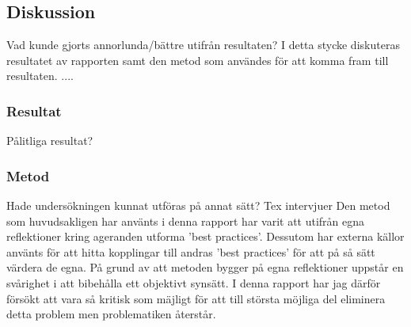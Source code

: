 \subsection{Diskussion}
Vad kunde gjorts annorlunda/bättre utifrån resultaten?
\newline \newline
I detta stycke diskuteras resultatet av rapporten samt den metod som användes för att komma fram till resultaten. ....

\subsubsection{Resultat}
Pålitliga resultat? 

\subsubsection{Metod}
Hade undersökningen kunnat utföras på annat sätt?
\newline
Tex intervjuer
\newline \newline
Den metod som huvudsakligen har använts i denna rapport har varit att utifrån egna reflektioner kring ageranden utforma 'best practices'. Dessutom har externa källor använts för att hitta kopplingar till andras 'best practices' för att på så sätt värdera de egna. 
\newline \newline
På grund av att metoden bygger på egna reflektioner uppstår en svårighet i att bibehålla ett objektivt synsätt. I denna rapport har jag därför försökt att vara så kritisk som mäjligt för att till största möjliga del eliminera detta problem men problematiken återstår. 